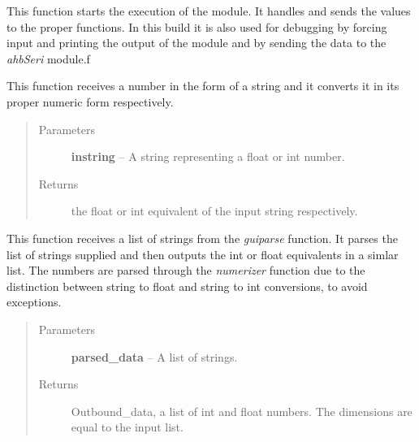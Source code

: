 \documentclass[letterpaper,10pt,english]{sphinxmanual}
\begin{document}

\begin{fulllineitems}
\label{Code:DataStrLeon.kickoff}
This function starts the execution of the module. It handles and sends the values to the proper 
functions. 
In this build it is also used for debugging by forcing input and printing the output of the module and 
by sending the data to the \emph{ahbSeri} module.f

\end{fulllineitems}


\begin{fulllineitems}
\label{Code:DataStrLeon.numerizer}
This function receives a number in the form of a string and it converts it in its 
proper numeric form respectively.
\begin{quote}\begin{description}
\item[{Parameters}] \leavevmode
\textbf{instring} -- A string representing a float or int number.

\item[{Returns}] \leavevmode
the float or int equivalent of the input string respectively.

\end{description}\end{quote}

\end{fulllineitems}


\begin{fulllineitems}
\label{Code:DataStrLeon.parsed2values}
This function receives a list of strings from the \emph{guiparse} function. 
It parses the list of strings supplied and then outputs the int or float equivalents in a simlar list.
The numbers are parsed through the \emph{numerizer} function due to the distinction between string to float and
string to int conversions, to avoid exceptions.
\begin{quote}\begin{description}
\item[{Parameters}] \leavevmode
\textbf{parsed\_data} -- A list of strings.

\item[{Returns}] \leavevmode
Outbound\_data, a list of int and float numbers. The dimensions are equal to the input list.

\end{description}\end{quote}

\end{fulllineitems}
\end{document}

